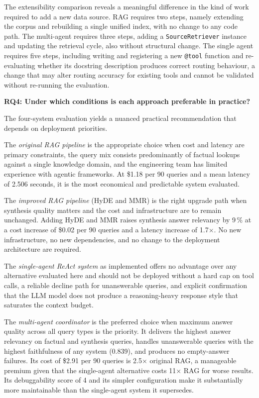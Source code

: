 The extensibility comparison reveals a meaningful difference in the kind of work required to add a new data source. RAG requires two steps, namely extending the corpus and rebuilding a single unified index, with no change to any code path. The multi-agent requires three steps, adding a \texttt{SourceRetriever} instance and updating the retrieval cycle, also without structural change. The single agent requires five steps, including writing and registering a new \texttt{@tool} function and re-evaluating whether its docstring description produces correct routing behaviour, a change that may alter routing accuracy for existing tools and cannot be validated without re-running the evaluation.

\textbf{RQ4: Under which conditions is each approach preferable in practice?}

The four-system evaluation yields a nuanced practical recommendation that depends on deployment priorities.

The \textit{original RAG pipeline} is the appropriate choice when cost and latency are primary constraints, the query mix consists predominantly of factual lookups against a single knowledge domain, and the engineering team has limited experience with agentic frameworks. At \$1.18 per 90 queries and a mean latency of 2.506 seconds, it is the most economical and predictable system evaluated.

The \textit{improved RAG pipeline} (HyDE and MMR) is the right upgrade path when synthesis quality matters and the cost and infrastructure are to remain unchanged. Adding HyDE and MMR raises synthesis answer relevancy by 9\,\% at a cost increase of \$0.02 per 90 queries and a latency increase of 1.7$\times$. No new infrastructure, no new dependencies, and no change to the deployment architecture are required.

The \textit{single-agent ReAct system} as implemented offers no advantage over any alternative evaluated here and should not be deployed without a hard cap on tool calls, a reliable decline path for unanswerable queries, and explicit confirmation that the LLM model does not produce a reasoning-heavy response style that saturates the context budget.

The \textit{multi-agent coordinator} is the preferred choice when maximum answer quality across all query types is the priority. It delivers the highest answer relevancy on factual and synthesis queries, handles unanswerable queries with the highest faithfulness of any system (0.839), and produces no empty-answer failures. Its cost of \$2.91 per 90 queries is 2.5$\times$ original RAG, a manageable premium given that the single-agent alternative costs 11$\times$ RAG for worse results. Its debuggability score of 4 and its simpler configuration make it substantially more maintainable than the single-agent system it supersedes.


